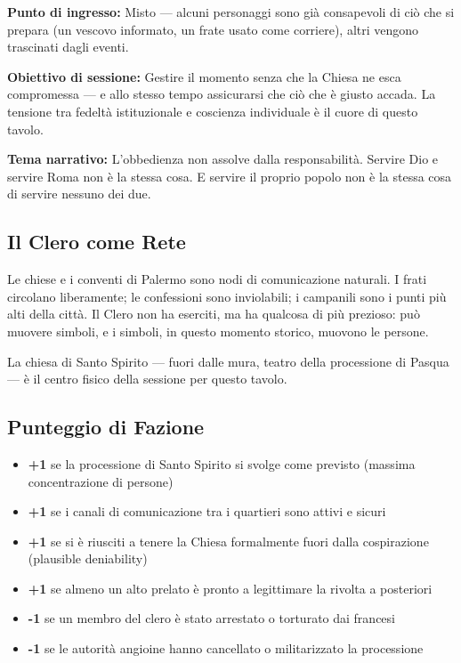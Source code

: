 \textbf{Punto di ingresso:} Misto — alcuni personaggi sono già consapevoli
di ciò che si prepara (un vescovo informato, un frate usato come
corriere), altri vengono trascinati dagli eventi.

\textbf{Obiettivo di sessione:} Gestire il momento senza che la Chiesa
ne esca compromessa — e allo stesso tempo assicurarsi che ciò che è
giusto accada. La tensione tra fedeltà istituzionale e coscienza
individuale è il cuore di questo tavolo.

\textbf{Tema narrativo:} L'obbedienza non assolve dalla responsabilità.
Servire Dio e servire Roma non è la stessa cosa. E servire il proprio
popolo non è la stessa cosa di servire nessuno dei due.

\subsection{Il Clero come Rete}

Le chiese e i conventi di Palermo sono nodi di comunicazione naturali.
I frati circolano liberamente; le confessioni sono inviolabili; i
campanili sono i punti più alti della città. Il Clero non ha eserciti,
ma ha qualcosa di più prezioso: può muovere simboli, e i simboli,
in questo momento storico, muovono le persone.

La chiesa di Santo Spirito — fuori dalle mura, teatro della
processione di Pasqua — è il centro fisico della sessione per questo tavolo.

\subsection{Punteggio di Fazione}

\begin{itemize}[nosep]
  \item \textbf{+1} se la processione di Santo Spirito si svolge
    come previsto (massima concentrazione di persone)
  \item \textbf{+1} se i canali di comunicazione tra i quartieri
    sono attivi e sicuri
  \item \textbf{+1} se si è riusciti a tenere la Chiesa formalmente
    fuori dalla cospirazione (plausible deniability)
  \item \textbf{+1} se almeno un alto prelato è pronto a legittimare
    la rivolta a posteriori
  \item \textbf{-1} se un membro del clero è stato arrestato o
    torturato dai francesi
  \item \textbf{-1} se le autorità angioine hanno cancellato o
    militarizzato la processione
\end{itemize}

